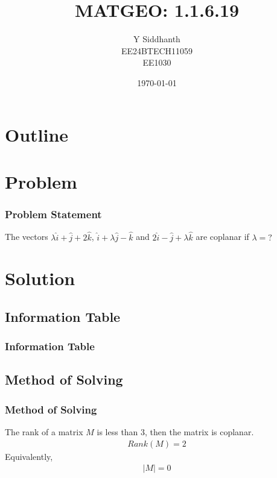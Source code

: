 \documentclass{beamer}
\title{MATGEO: 1.1.6.19}
\author{Y Siddhanth \\ EE24BTECH11059\\ EE1030}
\date{\today}
\providecommand{\brak}[1]{\ensuremath{\left(#1\right)}}
\theoremstyle{remark}
\providecommand{\abs}[1]{\left\vert#1\right\vert}
\numberwithin{equation}{section}
\begin{document}
\begin{frame}
\titlepage
\end{frame}

\section*{Outline}
\begin{frame}
\tableofcontents
\end{frame}
\section{Problem}
\begin{frame}
\frametitle{Problem Statement}
The vectors $\lambda\hat{i} + \hat{j} +2\hat{k}$, $\hat{i} + \lambda\hat{j} - \hat{k}$ and $2\hat{i} - \hat{j} +\lambda\hat{k}$  are coplanar if $\lambda = ?$
\end{frame}

\section{Solution}
\subsection{Information Table}
\begin{frame}
\frametitle{Information Table}
	\begin{table}[h!]    
		\centering
		
	\end{table}
\end{frame}
\subsection{Method of Solving}
\begin{frame}
	\frametitle{Method of Solving}
	The rank of a matrix $M$ is less than 3, then the matrix is coplanar. 
	\begin{align}
		Rank\brak{M} = 2\label{eq1.1.6.19.1}
	\end{align}
	Equivalently,
	\begin{align}
		\abs{M} = 0 \label{eq1.1.6.19.2}
	\end{align}
\end{frame}
\end{document}
